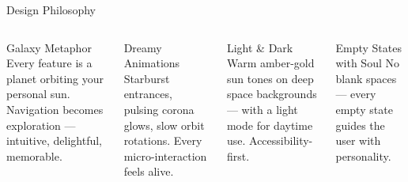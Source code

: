 \documentclass[aspectratio=43, 11pt]{beamer}
\begin{document}
\begin{frame}[shrink]{\textcolor{StarGold}{Design Philosophy}}

  \centering
  \vspace{0.3cm}

  \begin{columns}
    \begin{block}{\textcolor{Corona}{Galaxy Metaphor}}
      \small
      Every feature is a planet orbiting your personal sun. Navigation becomes exploration --- intuitive, delightful, memorable.
    \end{block}
    \vspace{0.3cm}
    \begin{block}{\textcolor{NebulaTeal}{Dreamy Animations}}
      \small
      Starburst entrances, pulsing corona glows, slow orbit rotations. Every micro-interaction feels alive.
    \end{block}

    \begin{block}{\textcolor{StarGold}{Light \& Dark}}
      \small
      Warm amber-gold sun tones on deep space backgrounds --- with a light mode for daytime use. Accessibility-first.
    \end{block}
    \vspace{0.3cm}
    \begin{block}{\textcolor{DustGray}{Empty States with Soul}}
      \small
      No blank spaces --- every empty state guides the user with personality.
    \end{block}
  \end{columns}
\end{frame}
\end{document}
